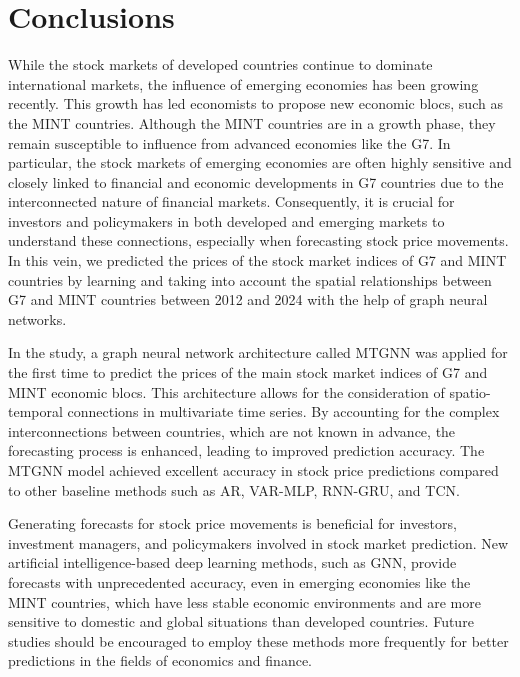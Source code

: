 \section{Conclusions}
\label{sec:conclusion}
%
While the stock markets of developed countries continue to dominate
international markets, the influence of emerging economies has been growing
recently. This growth has led economists to propose new economic blocs, such as
the MINT countries. Although the MINT countries are in a growth phase, they
remain susceptible to influence from advanced economies like the G7. In
particular, the stock markets of emerging economies are often highly sensitive
and closely linked to financial and economic developments in G7 countries due to
the interconnected nature of financial markets. Consequently, it is crucial for
investors and policymakers in both developed and emerging markets to understand
these connections, especially when forecasting stock price movements. In this
vein, we predicted the prices of the stock market indices of G7 and MINT
countries by learning and taking into account the spatial relationships between
G7 and MINT countries between 2012 and 2024 with the help of graph neural
networks.

In the study, a graph neural network architecture called MTGNN was applied for
the first time to predict the prices of the main stock market indices of G7 and
MINT economic blocs. This architecture allows for the consideration of
spatio-temporal connections in multivariate time series. By accounting for the
complex interconnections between countries, which are not known in advance, the
forecasting process is enhanced, leading to improved prediction accuracy. The
MTGNN model achieved excellent accuracy in stock price predictions compared to
other baseline methods such as AR, VAR-MLP, RNN-GRU, and TCN.

Generating forecasts for stock price movements is beneficial for investors,
investment managers, and policymakers involved in stock market prediction. New
artificial intelligence-based deep learning methods, such as GNN, provide
forecasts with unprecedented accuracy, even in emerging economies like the MINT
countries, which have less stable economic environments and are more sensitive
to domestic and global situations than developed countries. Future studies
should be encouraged to employ these methods more frequently for better
predictions in the fields of economics and finance.
